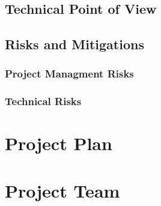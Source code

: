 \documentclass[runningheads]{llncs}
\begin{document}
\subsection{Technical Point of View}
\subsection{Risks and Mitigations}

	\subsubsection{Project Managment Risks}
	\subsubsection{Technical Risks}

\section{Project Plan}
\section{Project Team}





\end{document}
